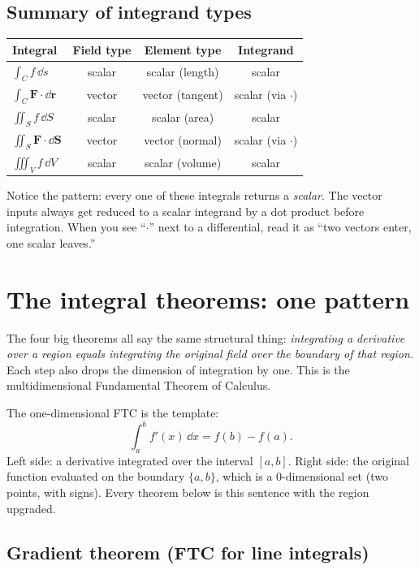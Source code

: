 \documentclass{essay}
\newcommand{\F}{\mathbf{F}}
\begin{document}
\subsection{Summary of integrand types}

\begin{center}
\renewcommand{\arraystretch}{1.4}
\begin{tabular}{@{}l c c c@{}}
\toprule
\textbf{Integral} & \textbf{Field type} & \textbf{Element type} & \textbf{Integrand} \\
\midrule
$\int_C f\,\dd s$            & scalar & scalar (length) & scalar \\
$\int_C \F\cdot\dd\mathbf{r}$ & vector & vector (tangent) & scalar (via $\cdot$) \\
$\iint_S f\,\dd S$           & scalar & scalar (area)   & scalar \\
$\iint_S \F\cdot\dd\mathbf{S}$ & vector & vector (normal) & scalar (via $\cdot$) \\
$\iiint_V f\,\dd V$          & scalar & scalar (volume) & scalar \\
\bottomrule
\end{tabular}
\end{center}

Notice the pattern: every one of these integrals returns a \emph{scalar}. The vector
inputs always get reduced to a scalar integrand by a dot product before integration.
When you see ``$\cdot$'' next to a differential, read it as ``two vectors enter, one
scalar leaves.''

\section{The integral theorems: one pattern}

The four big theorems all say the same structural thing: \emph{integrating a
derivative over a region equals integrating the original field over the boundary of
that region.} Each step also drops the dimension of integration by one. This is the
multidimensional Fundamental Theorem of Calculus.

The one-dimensional FTC is the template:
\[
\int_a^b f'(x)\,\dd x = f(b) - f(a).
\]
Left side: a derivative integrated over the interval $[a,b]$. Right side: the
original function evaluated on the boundary $\{a,b\}$, which is a $0$-dimensional set
(two points, with signs). Every theorem below is this sentence with the region
upgraded.

\subsection{Gradient theorem (FTC for line integrals)}
\end{document}
